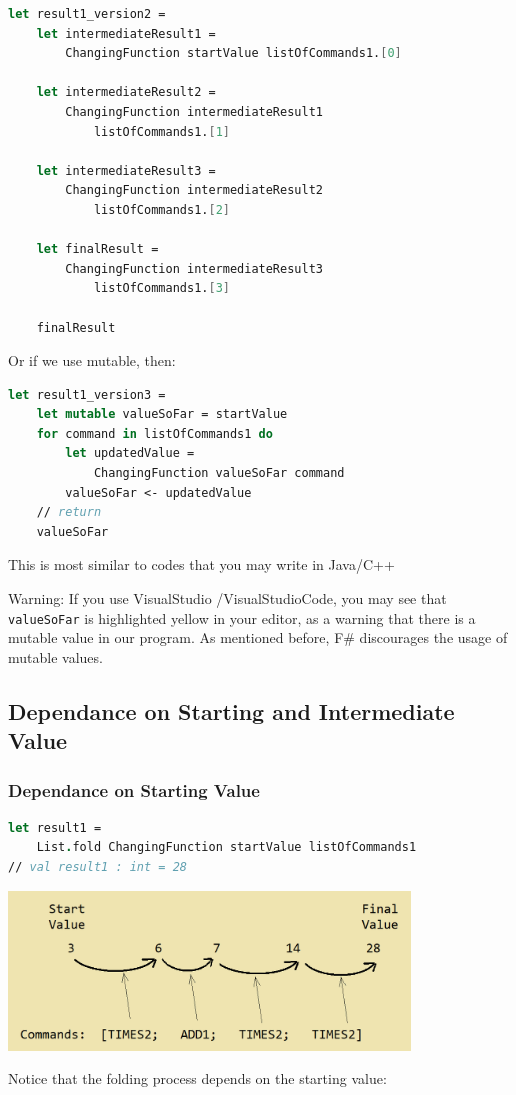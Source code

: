 \documentclass[12pt]{article}
\begin{document}
\begin{lstlisting}[language=FSharp]
let result1_version2 =
    let intermediateResult1 = 
        ChangingFunction startValue listOfCommands1.[0]

    let intermediateResult2 = 
        ChangingFunction intermediateResult1 
            listOfCommands1.[1]

    let intermediateResult3 = 
        ChangingFunction intermediateResult2 
            listOfCommands1.[2]

    let finalResult = 
        ChangingFunction intermediateResult3 
            listOfCommands1.[3]

    finalResult
\end{lstlisting}
Or if we use mutable, then:
\begin{lstlisting}[language=FSharp]
let result1_version3 =
    let mutable valueSoFar = startValue
    for command in listOfCommands1 do
        let updatedValue =
            ChangingFunction valueSoFar command
        valueSoFar <- updatedValue
    // return
    valueSoFar
\end{lstlisting}
This is most similar to codes that you may write in Java/C++

Warning: If you use VisualStudio /VisualStudioCode, you may see that \texttt{valueSoFar} is highlighted yellow in your editor, as a warning that there is a mutable value in our program. As mentioned before, F\# discourages the usage of mutable values.

\vfill

\pagebreak

\subsection{Dependance on Starting and Intermediate Value}

\subsubsection*{Dependance on Starting Value}

\begin{lstlisting}[language=FSharp]
let result1 =
    List.fold ChangingFunction startValue listOfCommands1
// val result1 : int = 28
\end{lstlisting}
\begin{center}
\includegraphics[width=0.8\textwidth]{pictures/picture31.png}
\end{center}
Notice that the folding process depends on the starting value:
\end{document}
